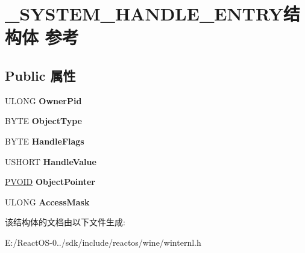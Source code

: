 \hypertarget{struct___s_y_s_t_e_m___h_a_n_d_l_e___e_n_t_r_y}{}\section{\+\_\+\+S\+Y\+S\+T\+E\+M\+\_\+\+H\+A\+N\+D\+L\+E\+\_\+\+E\+N\+T\+R\+Y结构体 参考}
\label{struct___s_y_s_t_e_m___h_a_n_d_l_e___e_n_t_r_y}
\subsection*{Public 属性}
\begin{DoxyCompactItemize}
\item 
\mbox{\label{struct___s_y_s_t_e_m___h_a_n_d_l_e___e_n_t_r_y_aa067b28682648c0a7d67c14a42f14db0}} 
U\+L\+O\+NG {\bfseries Owner\+Pid}
\item 
\mbox{\label{struct___s_y_s_t_e_m___h_a_n_d_l_e___e_n_t_r_y_a3acbc65d7d9fe3002901e50129dc0212}} 
B\+Y\+TE {\bfseries Object\+Type}
\item 
\mbox{\label{struct___s_y_s_t_e_m___h_a_n_d_l_e___e_n_t_r_y_a7141808e250cee6e4bb8e08b25413c86}} 
B\+Y\+TE {\bfseries Handle\+Flags}
\item 
\mbox{\label{struct___s_y_s_t_e_m___h_a_n_d_l_e___e_n_t_r_y_a91542d92aedaf552a9674d5437ea2357}} 
U\+S\+H\+O\+RT {\bfseries Handle\+Value}
\item 
\mbox{\label{struct___s_y_s_t_e_m___h_a_n_d_l_e___e_n_t_r_y_acd6c45ef571e2db4221cca04815875de}} 
\hyperlink{interfacevoid}{P\+V\+O\+ID} {\bfseries Object\+Pointer}
\item 
\mbox{\label{struct___s_y_s_t_e_m___h_a_n_d_l_e___e_n_t_r_y_a172857e4c514bad93c1c3aa6f34651a6}} 
U\+L\+O\+NG {\bfseries Access\+Mask}
\end{DoxyCompactItemize}


该结构体的文档由以下文件生成\+:\begin{DoxyCompactItemize}
\item 
E\+:/\+React\+O\+S-\/0../sdk/include/reactos/wine/winternl.\+h\end{DoxyCompactItemize}
